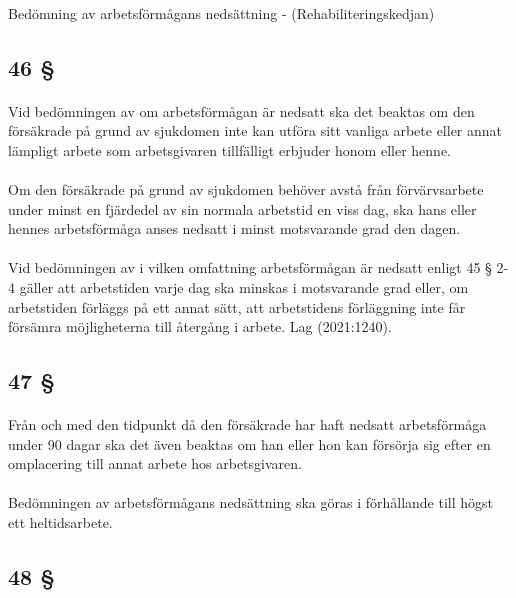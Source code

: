 \documentclass[a4paper,notitlepage,openany,10pt]{book}
\begin{document}
\paragraph*{}
Bedömning av arbetsförmågans nedsättning - (Rehabiliteringskedjan)
\subsection*{46 §}
\paragraph*{}
Vid bedömningen av om arbetsförmågan är nedsatt ska det beaktas om den försäkrade på grund av sjukdomen inte kan utföra sitt vanliga arbete eller annat lämpligt arbete som arbetsgivaren tillfälligt erbjuder honom eller henne.
\paragraph*{}
Om den försäkrade på grund av sjukdomen behöver avstå från förvärvsarbete under minst en fjärdedel av sin normala arbetstid en viss dag, ska hans eller hennes arbetsförmåga anses nedsatt i minst motsvarande grad den dagen.
\paragraph*{}
Vid bedömningen av i vilken omfattning arbetsförmågan är nedsatt enligt 45 § 2-4 gäller att arbetstiden varje dag ska minskas i motsvarande grad eller, om arbetstiden förläggs på ett annat sätt, att arbetstidens förläggning inte får försämra möjligheterna till återgång i arbete.
Lag (2021:1240).
\subsection*{47 §}
\paragraph*{}
Från och med den tidpunkt då den försäkrade har haft nedsatt arbetsförmåga under 90 dagar ska det även beaktas om han eller hon kan försörja sig efter en omplacering till annat arbete hos arbetsgivaren.
\paragraph*{}
Bedömningen av arbetsförmågans nedsättning ska göras i förhållande till högst ett heltidsarbete.
\subsection*{48 §}
\end{document}
